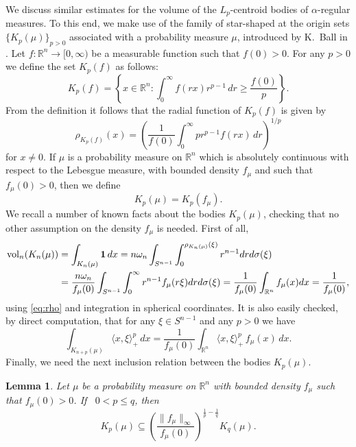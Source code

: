 \documentclass[11pt,leqno]{article}
\newtheorem{lemma}[theorem]{Lemma}
\theoremstyle{definition}
\theoremstyle{remark}
\numberwithin{equation}{section}
\newcommand{\vol}{{\rm vol}}
\newcommand{\ls}{\leqslant}
\newcommand{\gr}{\geqslant}
\newcommand{\1}{\textbf{1}}
\begin{document}
We discuss similar estimates for the volume of the $L_p$-centroid bodies of $\alpha$-regular measures.
To this end, we make use of the family of star-shaped at the origin sets $\{K_p(\mu)\}_{p>0}$
associated with a probability measure $\mu$, introduced by K.~Ball in \cite{Ball-1988}.
Let $f:\mathbb R^n\to [0,\infty)$ be a measurable function such that $f(0) >0$. For any $p>0$ we define
the set $K_p(f)$ as follows:
\begin{equation*}
K_p(f)=\left\{ x\in \mathbb R^n : \int_0^\infty f(rx)r^{p-1} \, dr\gr \frac{f(0)}{p}\right\}.
\end{equation*}
From the definition it follows that the radial function of $K_p(f)$ is given by
\begin{equation}\label{eq:rho}
\rho_{K_p(f)}(x)=\left (\frac{1}{f(0)}\int_0^{\infty}pr^{p-1}f(rx)\,dr\right )^{1/p}\end{equation}
for $x\neq 0$. If $\mu$ is a probability measure on $\mathbb R^n$ which is absolutely continuous with respect
to the Lebesgue measure, with bounded density $f_{\mu}$ and such that $f_{\mu}(0) > 0$, then we define
\begin{equation*}
K_p(\mu)=K_p(f_\mu).
\end{equation*}
We recall a number of known facts about the bodies $K_p(\mu)$, checking that no other assumption on the
density $f_{\mu}$ is needed. First of all,
\begin{align*}
\vol_n(K_{n}(\mu)) &= \int_{K_{n}(\mu)} \mathbf{1}\, dx= n\omega_n \int_{S^{n-1}}
\int_{0}^{\rho_{K_{n}(\mu)}(\xi)} r^{n-1} dr d\sigma(\xi)\\
&= \frac{n\omega_n}{f_{\mu}(0)} \int_{S^{n-1}}
\int_{0}^{\infty}  r^{n-1} f_{\mu}(r\xi) dr d\sigma (\xi)
= \frac{1}{f_{\mu}(0)} \int_{\mathbb R^n}f_{\mu}(x) dx=\frac{1}{f_{\mu}(0)},
\end{align*}
using \eqref{eq:rho} and integration in spherical coordinates. It is also easily checked,
by direct computation, that for any $\xi\in S^{n-1}$
and any $p>0$ we have \begin{equation}\label{eq:p-moments} \int_{K_{n+p}(\mu)}\langle x,
\xi\rangle_+^p \,dx=\frac{1}{f_{\mu}(0)}\int_{\mathbb R^n}\langle x,
\xi\rangle_+^p\, f_{\mu}(x) \, dx.
\end{equation}
Finally, we need the next inclusion relation between the bodies $K_p(\mu)$.

\begin{lemma}\label{lem:inclusions-between-Kp}
Let $\mu$ be a probability measure on $\mathbb{R}^n$ with bounded density $f_{\mu}$
such that $f_{\mu}(0)>0$. If \, $ 0 < p\ls q$, then
\begin{equation}\label{comparison}K_{p}(\mu)\subseteq
\left(\frac{\|f_{\mu}\|_{\infty}}{f_{\mu}(0)}\right)^{\frac{1}{p}-\frac{1}{q}}K_{q}(\mu).
\end{equation}
\end{lemma}
\end{document}
